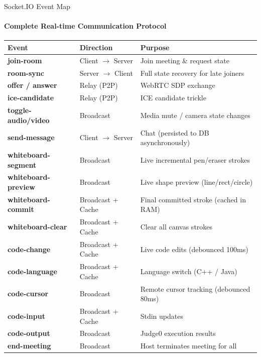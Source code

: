 \documentclass[aspectratio=169, 12pt]{beamer}
\begin{document}
\begin{frame}{Socket.IO Event Map}
  \framesubtitle{Complete Real-time Communication Protocol}
  \vspace{-0.2em}
  \begin{center}
  \scriptsize
  \renewcommand{\arraystretch}{0.95}
  \begin{tabular}{>{\bfseries\color{MeetPrimary}}l l >{\color{MeetGrey}}l}
    \toprule
    \textbf{\color{MeetDark}Event} & \textbf{\color{MeetDark}Direction} & \textbf{\color{MeetDark}Purpose} \\
    \midrule
    join-room          & Client $\rightarrow$ Server & Join meeting \& request state \\
    room-sync          & Server $\rightarrow$ Client & Full state recovery for late joiners \\
    \midrule
    offer / answer     & Relay (P2P)                 & WebRTC SDP exchange \\
    ice-candidate      & Relay (P2P)                 & ICE candidate trickle \\
    toggle-audio/video & Broadcast                   & Media mute / camera state changes \\
    \midrule
    send-message       & Client $\rightarrow$ Server & Chat (persisted to DB asynchronously) \\
    \midrule
    whiteboard-segment & Broadcast                   & Live incremental pen/eraser strokes \\
    whiteboard-preview & Broadcast                   & Live shape preview (line/rect/circle) \\
    whiteboard-commit  & Broadcast + Cache          & Final committed stroke (cached in RAM) \\
    whiteboard-clear   & Broadcast + Cache          & Clear all canvas strokes \\
    \midrule
    code-change        & Broadcast + Cache          & Live code edits (debounced 100ms) \\
    code-language      & Broadcast + Cache          & Language switch (C++ / Java) \\
    code-cursor        & Broadcast                  & Remote cursor tracking (debounced 80ms) \\
    code-input         & Broadcast + Cache          & Stdin updates \\
    code-output        & Broadcast                  & Judge0 execution results \\
    \midrule
    end-meeting        & Broadcast                   & Host terminates meeting for all \\
    \bottomrule
  \end{tabular}
  \end{center}
\end{frame}
\end{document}
